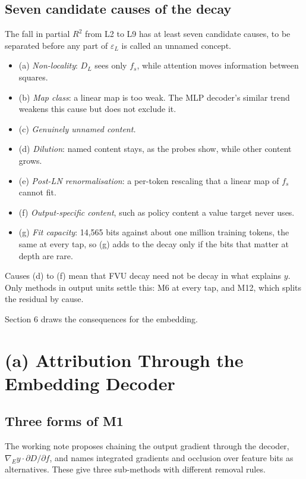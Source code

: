\documentclass[conference]{IEEEtran}
\begin{document}
\subsection{Seven candidate causes of the decay}\label{sec:5.4}
The fall in partial $R^2$ from L2 to L9 has at least seven candidate causes, to be separated before any part of $\varepsilon_L$ is called an unnamed concept.

\begin{itemize}
\item (a) \emph{Non-locality}: $D_L$ sees only $f_s$, while attention moves information between squares.
\item (b) \emph{Map class}: a linear map is too weak. The MLP decoder's similar trend weakens this cause but does not exclude it.
\item (c) \emph{Genuinely unnamed content.}
\item (d) \emph{Dilution}: named content stays, as the probes show, while other content grows.
\item (e) \emph{Post-LN renormalisation}: a per-token rescaling that a linear map of $f_s$ cannot fit.
\item (f) \emph{Output-specific content}, such as policy content a value target never uses.
\item (g) \emph{Fit capacity}: 14,565 bits against about one million training tokens, the same at every tap, so (g) adds to the decay only if the bits that matter at depth are rare.
\end{itemize}

Causes (d) to (f) mean that FVU decay need not be decay in what explains $y$. Only methods in output units settle this: M6 at every tap, and M12, which splits the residual by cause.

Section 6 draws the consequences for the embedding.

\section{(a) Attribution Through the Embedding Decoder}\label{sec:6}
\subsection{Three forms of M1}\label{sec:6.1}
The working note proposes chaining the output gradient through the decoder, $\nabla_E y\cdot\partial D/\partial f$, and names integrated gradients and occlusion over feature bits as alternatives. These give three sub-methods with different removal rules.
\end{document}
